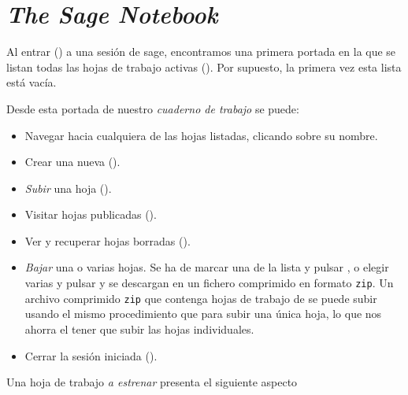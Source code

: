 \section[\emph{The Sage Notebook}]{\emph{The Sage Notebook}\footnotemark}


Al entrar () a una sesión de sage, encontramos
una primera portada en la que se listan todas las hojas de trabajo activas
(). Por supuesto, la
primera vez esta
lista está vacía. 



\label{subir}
Desde esta portada de nuestro \emph{cuaderno de trabajo} se
puede: 
\begin{itemize}
 \item Navegar hacia cualquiera de las hojas listadas, clicando
sobre su nombre.
\item Crear una nueva ().
\item \emph{Subir} una hoja ().
\label{subir}
\item Visitar hojas publicadas ().
\item Ver y recuperar hojas borradas (). 
\item \emph{Bajar} una o varias hojas. Se ha de marcar una de la lista y pulsar
, o elegir varias y pulsar  y se
descargan en un fichero comprimido en formato {\tt zip}. Un archivo comprimido
{\tt zip} que contenga hojas de trabajo de {\sage} se puede subir usando el
mismo procedimiento que para subir una \'unica hoja, lo que nos ahorra el tener
que subir las hojas individuales. 
\item Cerrar la sesión iniciada ().
\end{itemize}
\pagebreak[3]

\noindent\begin{minipage}{1\textwidth}
\indent Una hoja de trabajo \emph{a estrenar} presenta el siguiente
aspecto\footnotemark


\end{minipage}
\

